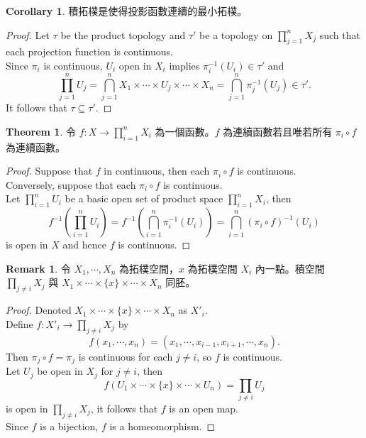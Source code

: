 \documentclass[12pt]{article}
\theoremstyle{definition}
\newtheorem{theorem}[definition]{Theorem}
\newtheorem{remark}[definition]{Remark}
\newtheorem{corollary}[definition]{Corollary}
\newcommand\<{\langle}
\renewcommand\>{\rangle}
\begin{document}
\begin{CJK}{UTF8}{bsmi}
\begin{corollary}
    積拓樸是使得投影函數連續的最小拓樸。
\end{corollary}
\begin{proof}
    Let $\tau$ be the product topology and $\tau'$ be a topology on $\prod_{j=1}^n X_j$ such that each projection function is continuous. \\
    Since $\pi_i$ is continuous, $U_i$ open in $X_i$ implies $\pi_i^{-1}(U_i) \in \tau'$ and
    \[
        \prod_{j=1}^n U_j
        = \bigcap_{j=1}^n X_1\times\cdots \times U_j\times\cdots\times X_n 
        = \bigcap_{j=1}^n \pi_j^{-1}(U_j) 
        \in \tau'.
    \]
    It follows that $\tau\subseteq\tau'$.
\end{proof}

\begin{theorem}
    令 $f:X\to\prod_{i=1}^n X_i$ 為一個函數。$f$ 為連續函數若且唯若所有 $\pi_i\circ f$ 為連續函數。
\end{theorem}
\begin{proof}
    Suppose that $f$ in continuous, then each $\pi_i\circ f$ is continuous. \\
    Conversely, suppose that each $\pi_i\circ f$ is continuous. \\
    Let $\prod_{i=1}^n U_i$ be a basic open set of product space $\prod_{i=1}^n X_i$, then
    \[
        f^{-1}\left(\prod_{i=1}^n U_i\right)
        = f^{-1}\left(\bigcap_{i=1}^n \pi_i^{-1}(U_i)\right)
        = \bigcap_{i=1}^n (\pi_i\circ f)^{-1}(U_i)
    \]
    is open in $X$ and hence $f$ is continuous.
\end{proof}

\begin{remark}
    令 $X_1, \cdots, X_n$ 為拓樸空間，$x$ 為拓樸空間 $X_i$ 內一點。積空間 $\prod_{j\ne i} X_j$ 與 $X_1\times\cdots\times\{x\}\times\cdots\times X_n$ 同胚。
\end{remark}
\begin{proof}
    Denoted $X_1\times\cdots\times\{x\}\times\cdots\times X_n$ as $X'_i$. \\
    Define $f:X'_i\to\prod_{j\ne i}X_j$ by
    \[
        f(x_1, \cdots, x_n) = (x_1, \cdots, x_{i-1}, x_{i+1}, \cdots, x_n).
    \]
    Then $\pi_j\circ f=\pi_j$ is continuous for each $j\ne i$, so $f$ is continuous. \\
    Let $U_j$ be open in $X_j$ for $j\ne i$, then
    \[
        f(U_1\times\cdots\times\{x\}\times\cdots\times U_n) = \prod_{j\ne i} U_j
    \]
    is open in $\prod_{j\ne i}X_j$, it follows that $f$ is an open map. \\
    Since $f$ is a bijection, $f$ is a homeomorphism.
\end{proof}


\end{CJK}
\end{document}
